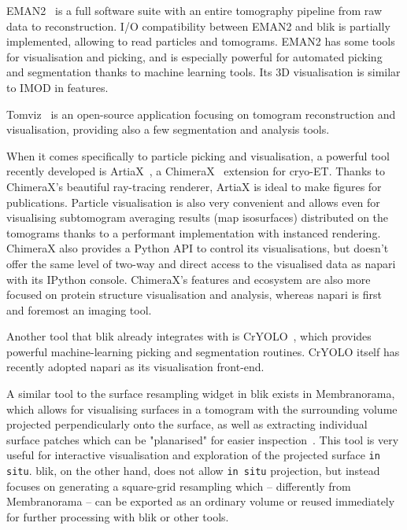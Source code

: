 EMAN2~\cite{galaz-montoyaSingleParticleTomography2015} is a full software suite with an entire tomography pipeline from raw data to reconstruction. I/O compatibility between EMAN2 and blik is partially implemented, allowing to read particles and tomograms. EMAN2 has some tools for visualisation and picking, and is especially powerful for automated picking and segmentation thanks to machine learning tools. Its 3D visualisation is similar to IMOD in features.

Tomviz~\cite{schwartzRealtime3DAnalysis2022} is an open-source application focusing on tomogram reconstruction and visualisation, providing also a few segmentation and analysis tools.

\vspace{\baselineskip}

When it comes specifically to particle picking and visualisation, a powerful tool recently developed is ArtiaX~\cite{ermelArtiaXElectronTomography2022}, a ChimeraX~\cite{pettersenUCSFChimeraXStructure2021} extension for cryo-ET. Thanks to ChimeraX's beautiful ray-tracing renderer, ArtiaX is ideal to make figures for publications. Particle visualisation is also very convenient and allows even for visualising subtomogram averaging results (map isosurfaces) distributed on the tomograms thanks to a performant implementation with instanced rendering. ChimeraX also provides a Python API to control its visualisations, but doesn't offer the same level of two-way and direct access to the visualised data as napari with its IPython console. ChimeraX's features and ecosystem are also more focused on protein structure visualisation and analysis, whereas napari is first and foremost an imaging tool.

Another tool that blik already integrates with is CrYOLO~\cite{wagnerSPHIREcrYOLOFastAccurate2019}, which provides powerful machine-learning picking and segmentation routines. CrYOLO itself has recently adopted napari as its visualisation front-end.

A similar tool to the surface resampling widget in blik exists in Membranorama, which allows for visualising surfaces in a tomogram with the surrounding volume projected perpendicularly onto the surface, as well as extracting individual surface patches which can be "planarised" for easier inspection~\cite{tegunovDtegunovMembranorama2024,wietrzynskiChartingNativeArchitecture2020}. This tool is very useful for interactive visualisation and exploration of the projected surface \texttt{in situ}. blik, on the other hand, does not allow \texttt{in situ} projection, but instead focuses on generating a square-grid resampling which -- differently from Membranorama -- can be exported as an ordinary volume or reused immediately for further processing with blik or other tools.

